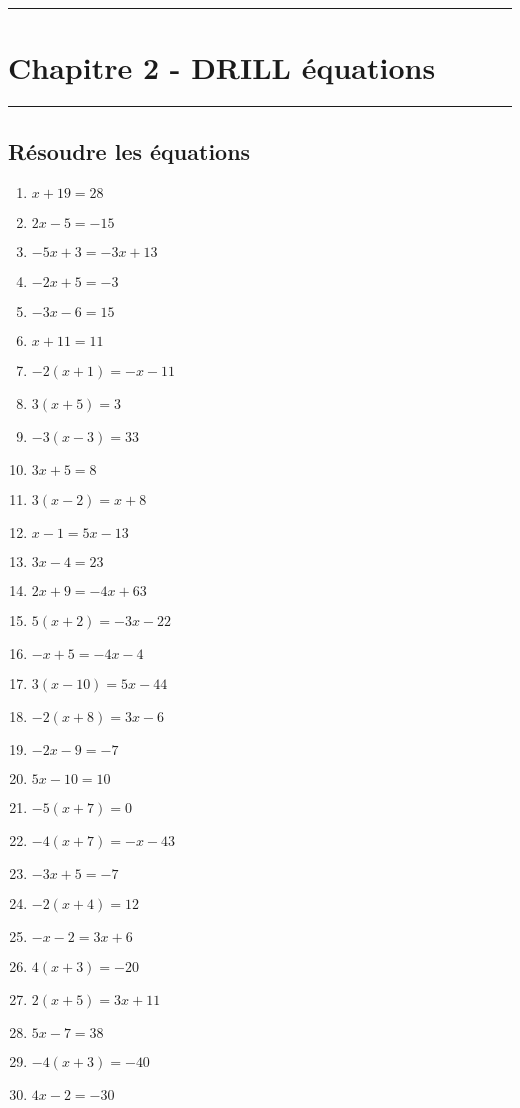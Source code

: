 \documentclass[11pt]{article}
\newcommand{\horrule}[1]{\rule{\linewidth}{#1}} %
\begin{document}
\setlength{\columnseprule}{1pt}


\horrule{2px}
\section*{Chapitre 2 - DRILL équations}
\horrule{2px}

\subsection*{Résoudre les équations}

\begin{multicols}{3}

\begin{enumerate}
    \item $x +19 = 28$
    \item $2x -5 = -15$
    \item $ -5x + 3 = -3x + 13$
    \item $ -2x + 5 = -3$
    \item $ -3x -6= 15$
    \item $ x + 11 = 11$
    \item $ -2(x+1) = -x - 11$
    \item $ 3(x+5) = 3$
    \item $-3(x-3) = 33$
    \item $ 3x + 5 = 8$
    \item $ 3(x-2) = x +8$
    \item $ x-1=5x-13 $
    \item $ 3x-4= 23$
    \item $ 2x+9=-4x+63 $
    \item $ 5(x+2)=-3x-22 $
    \item $ -x+5=-4x-4 $
    \item $ 3(x-10)=5x-44 $
    \item $ -2(x+8)=3x-6 $
    \item $ -2x-9=-7 $
    \item $ 5x-10=10 $
    \item $ -5(x+7)= 0$
    \item $ -4(x+7)=-x-43 $
    \item $ -3x+5=-7 $
    \item $ -2(x+4)=12 $
    \item $ -x-2=3x+6 $
    \item $ 4(x+3)=-20 $
    \item $ 2(x+5)=3x+11 $
    \item $ 5x-7=38 $
    \item $ -4(x+3)=-40 $
    \item $ 4x-2= -30$
\end{enumerate}

\end{multicols}
\end{document}
